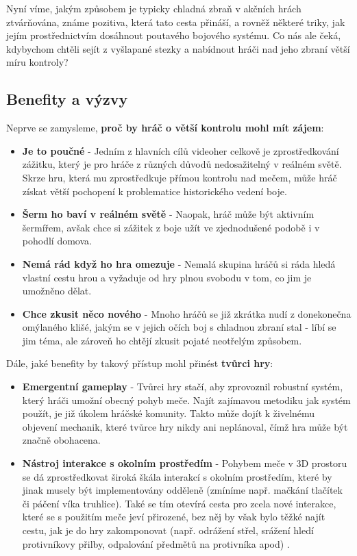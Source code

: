 Nyní víme, jakým způsobem je typicky chladná zbraň v akčních hrách ztvárňována, známe pozitiva, která tato cesta přináší, a rovněž některé triky, jak jejím prostřednictvím dosáhnout poutavého bojového systému. Co nás ale čeká, kdybychom chtěli sejít z vyšlapané stezky a nabídnout hráči nad jeho zbraní větší míru kontroly?

\subsection{Benefity a výzvy} \label{moreControlBenefitsSection}

Neprve se zamysleme, \textbf{proč by hráč o větší kontrolu mohl mít zájem}:
\begin{itemize}
    \item \textbf{Je to poučné} - Jedním z hlavních cílů videoher celkově je zprostředkování zážitku, který je pro hráče z různých důvodů nedosažitelný v reálném světě. Skrze hru, která mu zprostředkuje přímou kontrolu nad mečem, může hráč získat větší pochopení k problematice historického vedení boje.
    \item \textbf{Šerm ho baví v reálném světě} - Naopak, hráč může být aktivním šermířem, avšak chce si zážitek z boje užít ve zjednodušené podobě i v pohodlí domova.
    \item \textbf{Nemá rád když ho hra omezuje} - Nemalá skupina hráčů si ráda hledá vlastní cestu hrou a vyžaduje od hry plnou svobodu v tom, co jim je umožněno dělat. 
    \item \textbf{Chce zkusit něco nového} - Mnoho hráčů se již zkrátka nudí z donekonečna omýlaného klišé, jakým se v jejich očích boj s chladnou zbraní stal - líbí se jim téma, ale zároveň ho chtějí zkusit pojaté neotřelým způsobem.
\end{itemize}

Dále, jaké benefity by takový přístup mohl přinést \textbf{tvůrci hry}:
\begin{itemize}
    \item \textbf{Emergentní gameplay} - Tvůrci hry stačí, aby zprovoznil robustní systém, který hráči umožní obecný pohyb meče. Najít zajímavou metodiku jak systém použít, je již úkolem hráčské komunity. Takto může dojít k živelnému objevení mechanik, které tvůrce hry nikdy ani neplánoval, čímž hra může být značně obohacena.  
    \item \textbf{Nástroj interakce s okolním prostředím} - Pohybem meče v 3D prostoru se dá zprostředkovat široká škála interakcí s okolním prostředím, které by jinak musely být implementovány odděleně (zmíníme např. mačkání tlačítek či páčení víka truhlice). Také se tím otevírá cesta pro zcela nové interakce, které se s použitím meče jeví přirozené, bez něj by však bylo těžké najít cestu, jak je do hry zakomponovat (např. odrážení střel, srážení hledí protivníkovy přilby, odpalování předmětů na protivníka apod) .   
\end{itemize}

